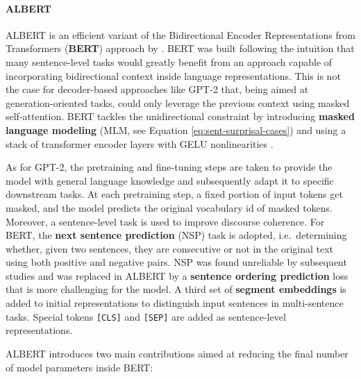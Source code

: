 \documentclass[a4paper, nobind]{templates/ociamthesis}
\begin{document}
\paragraph{ALBERT} ALBERT \autocite{lan-etal-2020-albert} is an efficient variant of the Bidirectional Encoder Representations from Transformers (\textbf{BERT}) approach by \textcite{devlin-etal-2019-bert}. BERT was built following the intuition that many sentence-level tasks would greatly benefit from an approach capable of incorporating bidirectional context inside language representations. This is not the case for decoder-based approaches like GPT-2 that, being aimed at generation-oriented tasks, could only leverage the previous context using masked self-attention. BERT tackles the unidirectional constraint by introducing \textbf{masked language modeling} (MLM, see Equation \eqref{eq:sent-surprisal-cases}) and using a stack of transformer encoder layers with GELU nonlinearities \autocite{hendrycks-gimpel-2016-gaussian}.

As for GPT-2, the pretraining and fine-tuning steps are taken to provide the model with general language knowledge and subsequently adapt it to specific downstream tasks. At each pretraining step, a fixed portion of input tokens get masked, and the model predicts the original vocabulary id of masked tokens. Moreover, a sentence-level task is used to improve discourse coherence. For BERT, the \textbf{next sentence prediction} (NSP) task is adopted, i.e.~determining whether, given two sentences, they are consecutive or not in the original text using both positive and negative pairs. NSP was found unreliable by subsequent studies and was replaced in ALBERT by a \textbf{sentence ordering prediction} loss that is more challenging for the model. A third set of \textbf{segment embeddings} is added to initial representations to distinguish input sentences in multi-sentence tasks. Special tokens \texttt{{[}CLS{]}} and \texttt{{[}SEP{]}} are added as sentence-level representations.

ALBERT introduces two main contributions aimed at reducing the final number of model parameters inside BERT:
\end{document}
